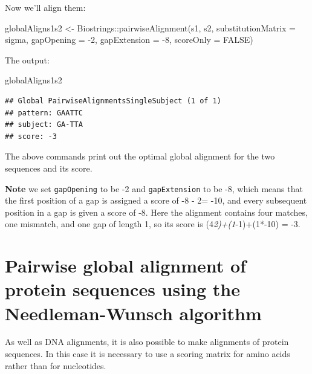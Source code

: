\documentclass[
]{book}
\newenvironment{Shaded}{\begin{snugshade}}{\end{snugshade}}
\newcommand{\AttributeTok}[1]{\textcolor[rgb]{0.77,0.63,0.00}{#1}}
\newcommand{\ConstantTok}[1]{\textcolor[rgb]{0.00,0.00,0.00}{#1}}
\newcommand{\DecValTok}[1]{\textcolor[rgb]{0.00,0.00,0.81}{#1}}
\newcommand{\FunctionTok}[1]{\textcolor[rgb]{0.00,0.00,0.00}{#1}}
\newcommand{\NormalTok}[1]{#1}
\newcommand{\OtherTok}[1]{\textcolor[rgb]{0.56,0.35,0.01}{#1}}
\newcommand{\SpecialCharTok}[1]{\textcolor[rgb]{0.00,0.00,0.00}{#1}}
\begin{document}
Now we'll align them:

\begin{Shaded}
\begin{Highlighting}[]
\NormalTok{globalAligns1s2 }\OtherTok{\textless{}{-}}\NormalTok{ Biostrings}\SpecialCharTok{::}\FunctionTok{pairwiseAlignment}\NormalTok{(s1, s2, }
                                                 \AttributeTok{substitutionMatrix =}\NormalTok{ sigma, }
                                                 \AttributeTok{gapOpening =} \SpecialCharTok{{-}}\DecValTok{2}\NormalTok{,}
                                                 \AttributeTok{gapExtension =} \SpecialCharTok{{-}}\DecValTok{8}\NormalTok{, }
                                                 \AttributeTok{scoreOnly =} \ConstantTok{FALSE}\NormalTok{)}
\end{Highlighting}
\end{Shaded}

The output:

\begin{Shaded}
\begin{Highlighting}[]
\NormalTok{globalAligns1s2 }
\end{Highlighting}
\end{Shaded}

\begin{verbatim}
## Global PairwiseAlignmentsSingleSubject (1 of 1)
## pattern: GAATTC
## subject: GA-TTA
## score: -3
\end{verbatim}

The above commands print out the optimal global alignment for the two sequences and its score.

\textbf{Note} we set \texttt{gapOpening} to be -2 and \texttt{gapExtension} to be -8, which means that the first position of a gap is assigned a score of -8 - 2= -10, and every subsequent position in a gap is given a score of -8. Here the alignment contains four matches, one mismatch, and one gap of length 1, so its score is (4\emph{2)+(1}-1)+(1*-10) = -3.

\hypertarget{pairwise-global-alignment-of-protein-sequences-using-the-needleman-wunsch-algorithm}{%
\section{Pairwise global alignment of protein sequences using the Needleman-Wunsch algorithm}\label{pairwise-global-alignment-of-protein-sequences-using-the-needleman-wunsch-algorithm}}

As well as DNA alignments, it is also possible to make alignments of protein sequences. In this case it is necessary to use a scoring matrix for amino acids rather than for nucleotides.
\end{document}
